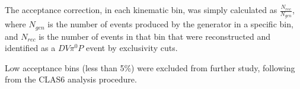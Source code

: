 

The acceptance correction, in each kinematic bin, was simply calculated as $\frac{N_{rec}}{N_{gen}}$, where $N_{gen}$ is the number of events produced by the generator in a specific bin, and $N_{rec}$ is the number of events in that bin that were reconstructed and identified as a $DV\pi^0P$ event by exclusivity cuts. 

Low acceptance bins (less than 5\%) were excluded from further study, following from the CLAS6 analysis procedure. 